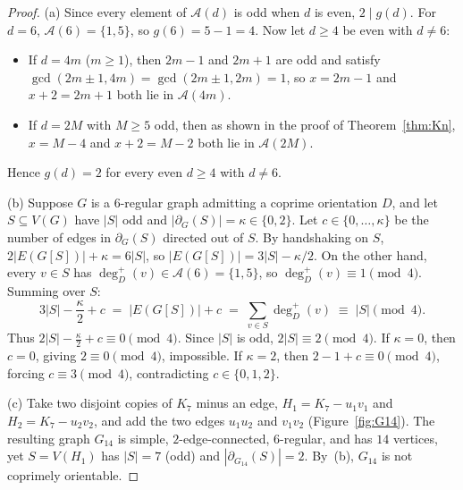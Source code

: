 \documentclass[11pt,a4paper]{article}
\theoremstyle{definition}
\theoremstyle{remark}
\newcommand{\outdeg}{\deg^{+}}
\newcommand{\Aset}{\mathcal{A}}
\begin{document}
\begin{proof}
(a) Since every element of $\Aset(d)$ is odd when $d$ is even, $2 \mid g(d)$. For $d = 6$, $\Aset(6) = \{1, 5\}$, so $g(6) = 5 - 1 = 4$. Now let $d \ge 4$ be even with $d \neq 6$:
\begin{itemize}[leftmargin=2em,itemsep=1pt]
  \item If $d = 4m$ ($m \ge 1$), then $2m - 1$ and $2m + 1$ are odd and satisfy $\gcd(2m \pm 1, 4m) = \gcd(2m \pm 1, 2m) = 1$, so $x = 2m - 1$ and $x + 2 = 2m + 1$ both lie in $\Aset(4m)$.
  \item If $d = 2M$ with $M \ge 5$ odd, then as shown in the proof of Theorem~\ref{thm:Kn}, $x = M - 4$ and $x + 2 = M - 2$ both lie in $\Aset(2M)$.
\end{itemize}
Hence $g(d) = 2$ for every even $d \ge 4$ with $d \neq 6$.

(b) Suppose $G$ is a $6$-regular graph admitting a coprime orientation $D$, and let $S \subseteq V(G)$ have $|S|$ odd and $|\partial_G(S)| = \kappa \in \{0, 2\}$. Let $c \in \{0, \dots, \kappa\}$ be the number of edges in $\partial_G(S)$ directed out of $S$. By handshaking on $S$, $2|E(G[S])| + \kappa = 6|S|$, so $|E(G[S])| = 3|S| - \kappa/2$. On the other hand, every $v \in S$ has $\outdeg_D(v) \in \Aset(6) = \{1, 5\}$, so $\outdeg_D(v) \equiv 1 \pmod{4}$. Summing over $S$:
\[
  3|S| - \frac{\kappa}{2} + c \;=\; |E(G[S])| + c \;=\; \sum_{v \in S} \outdeg_D(v) \;\equiv\; |S| \pmod{4}.
\]
Thus $2|S| - \frac{\kappa}{2} + c \equiv 0 \pmod{4}$. Since $|S|$ is odd, $2|S| \equiv 2 \pmod{4}$.
If $\kappa = 0$, then $c = 0$, giving $2 \equiv 0 \pmod{4}$, impossible.
If $\kappa = 2$, then $2 - 1 + c \equiv 0 \pmod{4}$, forcing $c \equiv 3 \pmod{4}$, contradicting $c \in \{0, 1, 2\}$.

(c) Take two disjoint copies of $K_7$ minus an edge, $H_1 = K_7 - u_1 v_1$ and $H_2 = K_7 - u_2 v_2$, and add the two edges $u_1 u_2$ and $v_1 v_2$ (Figure~\ref{fig:G14}). The resulting graph $G_{14}$ is simple, $2$-edge-connected, $6$-regular, and has $14$ vertices, yet $S = V(H_1)$ has $|S| = 7$ (odd) and $|\partial_{G_{14}}(S)| = 2$. By~(b), $G_{14}$ is not coprimely orientable.
\end{proof}
\end{document}
